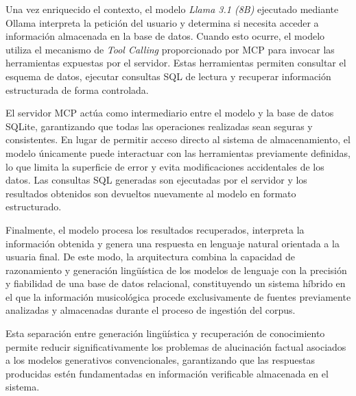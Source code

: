 Una vez enriquecido el contexto, el modelo \textit{Llama 3.1 (8B)} ejecutado mediante Ollama interpreta la petición del usuario y determina si necesita acceder a información almacenada en la base de datos. Cuando esto ocurre, el modelo utiliza el mecanismo de \textit{Tool Calling} proporcionado por MCP para invocar las herramientas expuestas por el servidor. Estas herramientas permiten consultar el esquema de datos, ejecutar consultas SQL de lectura y recuperar información estructurada de forma controlada.

El servidor MCP actúa como intermediario entre el modelo y la base de datos SQLite, garantizando que todas las operaciones realizadas sean seguras y consistentes. En lugar de permitir acceso directo al sistema de almacenamiento, el modelo únicamente puede interactuar con las herramientas previamente definidas, lo que limita la superficie de error y evita modificaciones accidentales de los datos. Las consultas SQL generadas son ejecutadas por el servidor y los resultados obtenidos son devueltos nuevamente al modelo en formato estructurado.

Finalmente, el modelo procesa los resultados recuperados, interpreta la información obtenida y genera una respuesta en lenguaje natural orientada a la usuaria final. De este modo, la arquitectura combina la capacidad de razonamiento y generación lingüística de los modelos de lenguaje con la precisión y fiabilidad de una base de datos relacional, constituyendo un sistema híbrido en el que la información musicológica procede exclusivamente de fuentes previamente analizadas y almacenadas durante el proceso de ingestión del corpus.

Esta separación entre generación lingüística y recuperación de conocimiento permite reducir significativamente los problemas de alucinación factual asociados a los modelos generativos convencionales, garantizando que las respuestas producidas estén fundamentadas en información verificable almacenada en el sistema.


